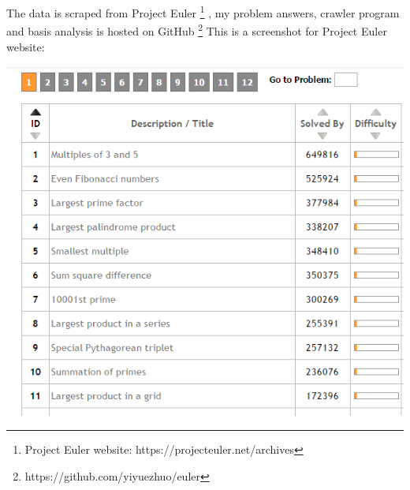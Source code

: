 \documentclass{article}
\begin{document}
\begin{figure}[h]

\centering

 
\end{figure}

The data is scraped from Project Euler \footnote{Project Euler website: https://projecteuler.net/archives }
, my problem answers, crawler program and basis analysis is hosted on GitHub \footnote{https://github.com/yiyuezhuo/euler }
This is a screenshot for Project Euler website:

\includegraphics[scale=0.55]{euler-oj.png}
\end{document}
